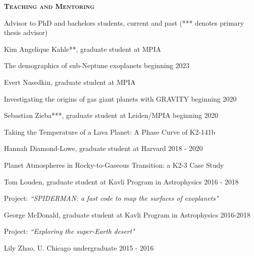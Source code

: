 \documentclass[12pt,letterpaper]{article}
\begin{document}
\vspace{7mm}
\textbf{\textsc{Teaching and Mentoring}} 
\begin{compactitem}[]
\item Advisor to PhD and bachelors students, current and past (*** denotes primary thesis advisor)
	\begin{compactitem}
        \item Kim Angelique Kahle**, graduate student at MPIA \hfill  
		\begin{sloppypar}
	         The demographics of sub-Neptune exoplanets \hfill beginning 2023
		\end{sloppypar}
        \item Evert Nasedkin, graduate student at MPIA \hfill 
		\begin{sloppypar}
	         Investigating the origins of gas giant planets with GRAVITY \hfill beginning 2020	
		\end{sloppypar}
        \item Sebastian Zieba***, graduate student at Leiden/MPIA \hfill beginning 2020
		\begin{sloppypar}
		Taking the Temperature of a Lava Planet: A Phase Curve of K2-141b
		\end{sloppypar}
        \item Hannah Diamond-Lowe, graduate student at Harvard \hfill 2018 - 2020
		\begin{sloppypar}
		Planet Atmospheres in Rocky-to-Gaseous Transition: a K2-3 Case Study
		\end{sloppypar}
	\item Tom Louden, graduate student at Kavli Program in Astrophysics \hfill 2016 - 2018
		\begin{sloppypar}
		Project: \textit{``SPIDERMAN: a fast code to map the surfaces of exoplanets"}
		\end{sloppypar}
	\item George McDonald, graduate student at Kavli Program in Astrophysics \hfill 2016-2018
		\begin{sloppypar}
		Project: \textit{``Exploring the super-Earth desert"}
		\end{sloppypar}
	\item Lily Zhao, U. Chicago undergraduate \hfill 2015 - 2016

\end{compactitem}
\end{compactitem}
\end{document}
